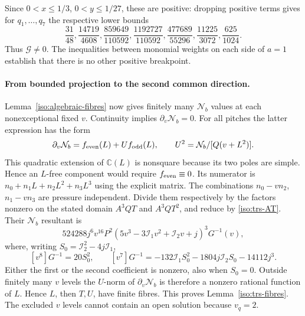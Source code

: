 \documentclass[11pt,a4paper]{article}
\numberwithin{equation}{section}
\theoremstyle{plain}
\theoremstyle{definition}
\theoremstyle{remark}
\begin{document}
Since $0<x\le1/3$, $0<y\le1/27$, these are positive: dropping positive
terms gives for $q_1,\ldots,q_7$ the respective lower bounds
\[
 \frac{31}{48},\frac{14719}{4608},\frac{859649}{110592},
 \frac{1192727}{110592},\frac{477689}{55296},
 \frac{11225}{3072},\frac{625}{1024}.
\]
Thus $\mathcal G\ne0$. The inequalities between monomial weights on each side of
$a=1$ establish that there is no other positive breakpoint.  

\paragraph{From bounded projection to the second common direction.}
Lemma~\ref{iso:algebraic-fibres} now gives finitely many $\mathcal N_b$ values at
each nonexceptional fixed $v$.  Continuity implies $\partial_\upsilon\mathcal N_b=0$.
For all pitches the latter expression has the form
\[
 \partial_\upsilon\mathcal N_b=f_{\rm even}(L)+Uf_{\rm odd}(L),\qquad
 U^2=\mathcal N_b/[Q(v+L^2)].
\]
This quadratic extension of $\mathbb C(L)$ is nonsquare because its two
poles are simple.  Hence an $L$-free component would require
$f_{\rm even}\equiv0$.  Its numerator is
$n_0+n_1L+n_2L^2+n_3L^3$ using the explicit matrix.  The combinations
$n_0-vn_2$, $n_1-vn_3$ are pressure independent.  Divide them respectively
by the factors nonzero on the stated domain $A^3QT$ and $A^3QT^2$, and reduce by
\eqref{iso:trs-AT}.  Their $\mathcal N_b$ resultant is
\begin{equation}\label{iso:trs-L-resultant}
 524288j^6v^{16}P^2(5v^3-3\mathcal I_1v^2+\mathcal I_2v+j)^3 G^{-1}(v),
\end{equation}
where, writing $S_0=\mathcal I_2^2-4j\mathcal I_1$,
\[
 [v^8]G^{-1}=20S_0^2,\qquad
 [v^7]G^{-1}=-132\mathcal I_1S_0^2-1804j\mathcal I_2S_0-14112j^3.
\]
Either the first or the second coefficient is nonzero, also when $S_0=0$.  Outside finitely many $v$ levels the $U$-norm of $\partial_\upsilon\mathcal N_b$
is therefore a nonzero rational function of $L$.  Hence $L$, then $T,U$,
have finite fibres.  This proves Lemma~\ref{iso:trs-fibres}.
The excluded $v$ levels cannot contain an open solution because $v_q=2$.
\end{document}
